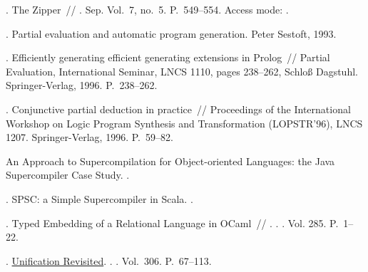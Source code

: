 \begin{thebibliography}{10}
  . The Zipper~//
    \href{http://dx.doi.org/10.1017/S0956796897002864}{} \BibDash
  . \BibDash Sep. \BibDash
  \newblock Vol.~7, no.~5. \BibDash
  \newblock P.~549–554. \BibDash
  \newblock Access mode: .

  . Partial evaluation and
    automatic program generation. \BibDash
  \newblock Peter Sestoft, 1993.

  . Efficiently generating efficient
    generating extensions in Prolog~// Partial Evaluation, International Seminar,
    LNCS 1110, pages 238–262, Schloß Dagstuhl. \BibDash
  \newblock Springer-Verlag, 1996. \BibDash
  \newblock P.~238--262.

  . Conjunctive
    partial deduction in practice~// Proceedings of the International Workshop on
    Logic Program Synthesis and Transformation (LOPSTR'96), LNCS 1207. \BibDash
  \newblock Springer-Verlag, 1996. \BibDash
  \newblock P.~59--82.

   An Approach to Supercompilation for Object-oriented
    Languages: the Java Supercompiler Case Study. \BibDash
  .

  . SPSC: a Simple Supercompiler in
    Scala. \BibDash
  .

  . Typed Embedding of a Relational
    Language in OCaml~//
    \href{http://dx.doi.org/10.4204/EPTCS.285.1}{}. \BibDash
  . . \BibDash
  \newblock Vol. 285. \BibDash
  \newblock P.~1--22.

  .
    \href{http://dx.doi.org/10.1007/3-540-19129-1_4}{Unification Revisited}.
    \BibDash
  . . \BibDash
  \newblock Vol.~306. \BibDash
  \newblock P.~67--113.


\end{thebibliography}
